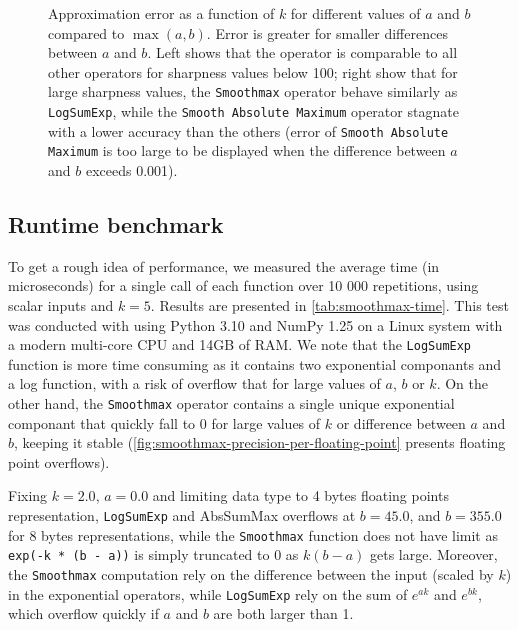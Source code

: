 \begin{figure}
    \caption{Approximation error as a function of $k$ for different values of $a$ and $b$ compared to $\max(a, b)$. Error is greater for smaller differences between $a$ and $b$. Left shows that the operator is comparable to all other operators for sharpness values below 100; right show that for large sharpness values, the \texttt{Smoothmax} operator behave similarly as \texttt{LogSumExp}, while the \texttt{Smooth Absolute Maximum} operator stagnate with a lower accuracy than the others (error of \texttt{Smooth Absolute Maximum} is too large to be displayed when the difference between $a$ and $b$ exceeds 0.001). }
    \label{fig:smoothmax-sharpness}
\end{figure}

\subsection*{Runtime benchmark}

To get a rough idea of performance, we measured the average time (in microseconds) for a single call of each function over 10 000 repetitions, using scalar inputs and $k = 5$. Results are presented in \cref{tab:smoothmax-time}. This test was conducted with using Python 3.10 and NumPy 1.25 on a Linux system with a modern multi-core CPU and 14GB of RAM. We note that the \texttt{LogSumExp} function is more time consuming as it contains two exponential componants and a log function, with a risk of overflow that for large values of $a$, $b$ or $k$. On the other hand, the \texttt{Smoothmax} operator contains a single unique exponential componant that quickly fall to 0 for large values of $k$ or difference between $a$ and $b$, keeping it stable (\cref{fig:smoothmax-precision-per-floating-point} presents floating point overflows). 

Fixing $k = 2.0$, $a = 0.0$ and limiting data type to 4 bytes floating points representation, \texttt{LogSumExp} and AbsSumMax overflows at $b = 45.0$, and $b = 355.0$ for 8 bytes representations, while the \texttt{Smoothmax} function does not have limit as \texttt{exp(-k * (b - a))} is simply truncated to 0 as $k (b - a)$ gets large. Moreover, the \texttt{Smoothmax} computation rely on the difference between the input (scaled by $k$) in the exponential operators, while \texttt{LogSumExp} rely on the sum of $e^{ak}$ and $e^{bk}$, which overflow quickly if $a$ and $b$ are both larger than 1.

